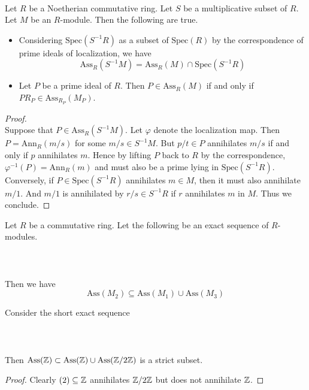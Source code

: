 \documentclass[a4paper]{article}
\begin{document}
\begin{prp}{}{}\\
Let $R$ be a Noetherian commutative ring. Let $S$ be a multiplicative subset of $R$. Let $M$ be an $R$-module. Then the following are true. 
\begin{itemize}
\item Considering $\text{Spec}(S^{-1}R)$ as a subset of $\text{Spec}(R)$ by the correspondence of prime ideals of localization, we have $$\text{Ass}_R(S^{-1}M)=\text{Ass}_R(M)\cap\text{Spec}(S^{-1}R)$$
\item Let $P$ be a prime ideal of $R$. Then $P\in\text{Ass}_R(M)$ if and only if $PR_P\in\text{Ass}_{R_P}(M_P)$. 
\end{itemize}
\begin{proof}\\
Suppose that $P\in\text{Ass}_R(S^{-1}M)$. Let $\varphi$ denote the localization map. Then $P=\text{Ann}_R(m/s)$ for some $m/s\in S^{-1}M$. But $p/t\in P$ annihilates $m/s$ if and only if $p$ annihilates $m$. Hence by lifting $P$ back to $R$ by the correspondence, $\varphi^{-1}(P)=\text{Ann}_R(m)$ and must also be a prime lying in $\text{Spec}(S^{-1}R)$. \\

Conversely, if $P\in\text{Spec}(S^{-1}R)$ annihilates $m\in M$, then it must also annihilate $m/1$. And $m/1$ is annihilated by $r/s\in S^{-1}R$ if $r$ annihilates $m$ in $M$. Thus we conclude. 
\end{proof}
\end{prp}

\begin{prp}{}{} Let $R$ be a commutative ring. Let the following be an exact sequence of $R$-modules. \\~\\
\\~\\
Then we have $$\text{Ass}(M_2)\subseteq\text{Ass}(M_1)\cup\text{Ass}(M_3)$$
\end{prp}

\begin{eg}{}{} Consider the short exact sequence \\~\\
\\~\\
Then $\text{Ass}(\mathbb{Z})\subset\text{Ass}(\mathbb{Z})\cup\text{Ass}(\mathbb{Z}/2\mathbb{Z})$ is a strict subset. 
\begin{proof}
Clearly $(2)\subseteq\mathbb{Z}$ annihilates $\mathbb{Z}/2\mathbb{Z}$ but does not annihilate $\mathbb{Z}$. 
\end{proof}
\end{eg}
\end{document}
